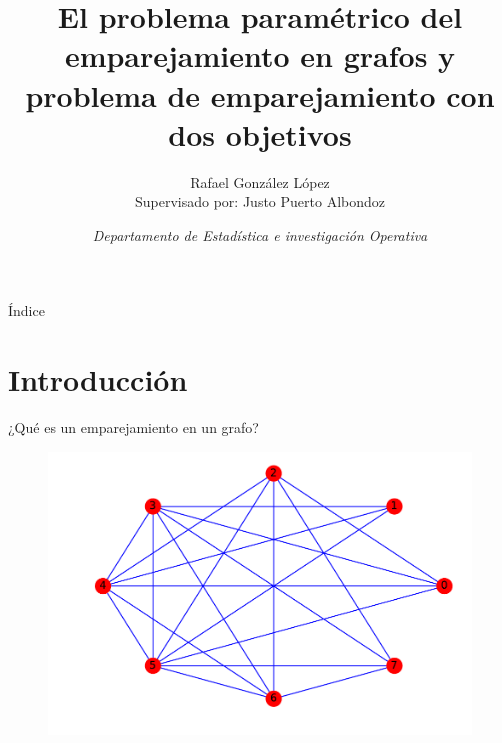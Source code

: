 \documentclass{beamer}
\title[El problema paramétrico del emparejamiento en grafos y problema de emparejamiento con dos objetivos]{\textbf{\textup{El problema paramétrico del emparejamiento en grafos y problema de emparejamiento con dos objetivos}}}
\author{Rafael González López\\ Supervisado por: Justo Puerto Albondoz\\}
\institute{Universidad de Sevilla}
\date{\textit{Departamento de Estadística e investigación Operativa}}
\begin{document}

\begin{frame}
  \titlepage
\end{frame}


\begin{frame}{Índice}
 \tableofcontents
\end{frame}



\section{Introducción}

\begin{frame}{¿Qué es un emparejamiento en un grafo?}
\begin{figure}[h!]
\includegraphics[scale=0.45]{opt}
\end{figure}
\end{frame}

\end{document}
